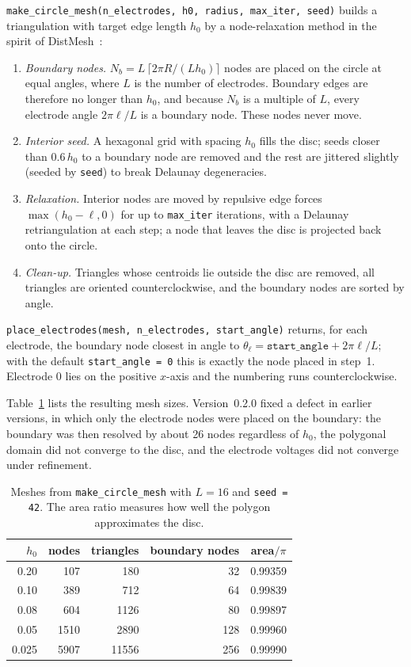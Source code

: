 \documentclass[11pt,a4paper]{article}
\newcommand{\code}[1]{\texttt{#1}}
\begin{document}
\code{make\_circle\_mesh(n\_electrodes, h0, radius, max\_iter, seed)} builds
a triangulation with target edge length $h_0$ by a node-relaxation method in
the spirit of DistMesh~\cite{PerssonStrang2004}:
\begin{enumerate}
  \item \emph{Boundary nodes.} $N_b = L\,\lceil 2\pi R/(L h_0)\rceil$ nodes
        are placed on the circle at equal angles, where $L$ is the number of
        electrodes. Boundary edges are therefore no longer than $h_0$, and
        because $N_b$ is a multiple of $L$, every electrode angle
        $2\pi\ell/L$ is a boundary node. These nodes never move.
  \item \emph{Interior seed.} A hexagonal grid with spacing $h_0$ fills the
        disc; seeds closer than $0.6\,h_0$ to a boundary node are removed and
        the rest are jittered slightly (seeded by \code{seed}) to break
        Delaunay degeneracies.
  \item \emph{Relaxation.} Interior nodes are moved by repulsive edge forces
        $\max(h_0-\ell,0)$ for up to \code{max\_iter} iterations, with a
        Delaunay retriangulation at each step; a node that leaves the disc is
        projected back onto the circle.
  \item \emph{Clean-up.} Triangles whose centroids lie outside the disc are
        removed, all triangles are oriented counterclockwise, and the boundary
        nodes are sorted by angle.
\end{enumerate}
\code{place\_electrodes(mesh, n\_electrodes, start\_angle)} returns, for each
electrode, the boundary node closest in angle to
$\theta_\ell = \code{start\_angle} + 2\pi\ell/L$; with the default
\code{start\_angle = 0} this is exactly the node placed in step~1. Electrode
$0$ lies on the positive $x$-axis and the numbering runs counterclockwise.

Table~\ref{tab:mesh} lists the resulting mesh sizes. Version~0.2.0 fixed a
defect in earlier versions, in which only the electrode nodes were placed on
the boundary: the boundary was then resolved by about 26 nodes regardless of
$h_0$, the polygonal domain did not converge to the disc, and the electrode
voltages did not converge under refinement.

\begin{table}[ht]
\centering
\caption{Meshes from \code{make\_circle\_mesh} with $L=16$ and
\code{seed = 42}. The area ratio measures how well the polygon approximates
the disc.}
\label{tab:mesh}
\begin{tabular}{rrrrc}
\toprule
$h_0$ & nodes & triangles & boundary nodes & area$/\pi$ \\
\midrule
0.20  &  107 &   180 &  32 & 0.99359 \\
0.10  &  389 &   712 &  64 & 0.99839 \\
0.08  &  604 &  1126 &  80 & 0.99897 \\
0.05  & 1510 &  2890 & 128 & 0.99960 \\
0.025 & 5907 & 11556 & 256 & 0.99990 \\
\bottomrule
\end{tabular}
\end{table}
\end{document}
